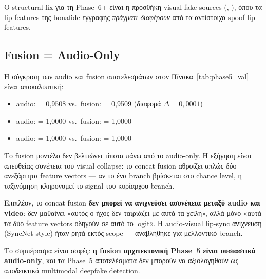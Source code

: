 Ο structural fix για τη Phase~6+ είναι η προσθήκη
visual-fake sources (, ),
όπου τα lip features της bonafide εγγραφής
\emph{πράγματι διαφέρουν} από τα αντίστοιχα spoof lip features.

\subsection{Fusion = Audio-Only}
\label{subsec:fusion-equals-audio}

Η σύγκριση των audio και fusion αποτελεσμάτων
στον Πίνακα~\ref{tab:phase5_val} είναι αποκαλυπτική:

\begin{itemize}
  \item {} audio: \AUC{} = 0{,}9508
        vs.\ fusion: \AUC{} = 0{,}9509 (διαφορά $\Delta = 0{,}0001$)
  \item {} audio: \AUC{} = 1{,}0000
        vs.\ fusion: \AUC{} = 1{,}0000
  \item {} audio: \AUC{} = 1{,}0000
        vs.\ fusion: \AUC{} = 1{,}0000
\end{itemize}

Το fusion μοντέλο δεν βελτιώνει τίποτα πάνω από το audio-only.
Η εξήγηση είναι απευθείας συνέπεια του visual collapse:
το concat fusion αθροίζει απλώς δύο ανεξάρτητα feature vectors —
αν το ένα branch βρίσκεται στο chance level,
η ταξινόμηση κληρονομεί το signal του κυρίαρχου branch.

Επιπλέον, το concat fusion \textbf{δεν μπορεί να ανιχνεύσει
ασυνέπεια μεταξύ audio και video}:
δεν μαθαίνει «αυτός ο ήχος δεν ταιριάζει με αυτά τα χείλη»,
αλλά μόνο «αυτά τα δύο feature vectors οδηγούν σε αυτό το logit».
Η audio-visual lip-sync ανίχνευση (SyncNet-style) ήταν ρητά
εκτός scope — αναβλήθηκε για μελλοντικό  branch.

Το συμπέρασμα είναι σαφές:
\textbf{η fusion αρχιτεκτονική Phase~5 είναι ουσιαστικά audio-only},
και τα Phase~5 αποτελέσματα δεν μπορούν να αξιολογηθούν ως
αποδεικτικά multimodal deepfake detection.
